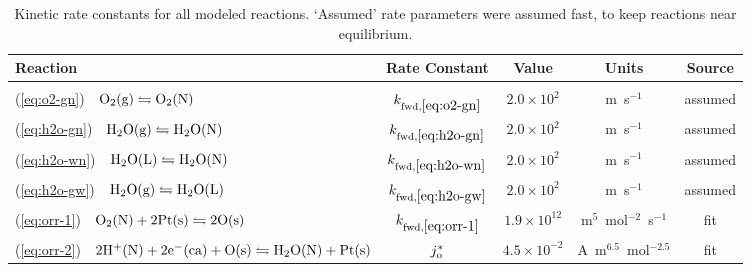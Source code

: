 \documentclass[final,3p,times,twocolumn]{elsarticle}    %
\begin{document}
\begin{table}[!ht]
    \small
    \centering
    \caption{Kinetic rate constants for all modeled reactions. `Assumed' rate parameters were assumed fast, to keep reactions near equilibrium.}
    \vspace*{1mm}
    
    \begin{tabular}{l c c c c}
    \hline \hline
    Reaction &Rate Constant               &Value         &Units      &Source \\
    \hline \vspace*{-3mm} \\
    (\ref{eq:o2-gn}) \,\, ${\rm O_2(g) \leftrightharpoons O_2(N)}$ &$k_{\rm fwd,\ref{eq:o2-gn}}$   &$2.0\times10^{2}$ &m~s$^{-1}$ &assumed\\
    (\ref{eq:h2o-gn}) \,\, ${\rm H_2O(g) \leftrightharpoons H_2O(N)}$ &$k_{\rm fwd,\ref{eq:h2o-gn}}$ &$2.0\times10^{2}$ &m~s$^{-1}$ &assumed\\
    (\ref{eq:h2o-wn}) \,\, ${\rm H_2O(L) \leftrightharpoons H_2O(N)}$ &$k_{\rm fwd,\ref{eq:h2o-wn}}$ &$2.0\times10^{2}$ &m~s$^{-1}$ &assumed\\
    (\ref{eq:h2o-gw}) \,\, ${\rm H_2O(g) \leftrightharpoons H_2O(L)}$ &$k_{\rm fwd,\ref{eq:h2o-gw}}$ &$2.0\times10^{2}$ &m~s$^{-1}$ &assumed\\
    (\ref{eq:orr-1}) \,\, ${\rm O_2(N) + 2Pt(s) \leftrightharpoons 2O(s)}$ & $k_{\rm fwd,\ref{eq:orr-1}}$ &$1.9\times10^{12}$ &m$^5$~mol$^{-2}$~s$^{-1}$ &fit\\
    (\ref{eq:orr-2}) \,\, ${\rm 2H^{+}(N) + 2e^{-}(ca) + O(s) \leftrightharpoons H_2O(N) + Pt(s)}$ &$j_{\rm o}^{*}$ &$4.5\times10^{-2}$ &A~m$^{6.5}$~mol$^{-2.5}$ &fit\\
    \hline \hline
    \end{tabular}
    \label{tab:kinetics}
\end{table}
\end{document}
